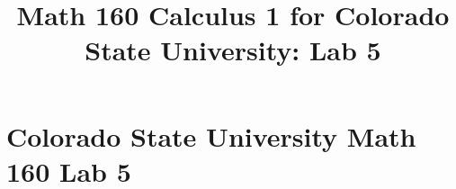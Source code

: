 \documentclass[10pt,handout,twocolumn,twoside,wordchoicegiven]{xourse}
\title{Math 160 Calculus 1 for Colorado State University: Lab 5}
\begin{document}
\maketitle

\setcounter{tocdepth}{2}


\part{Colorado State University Math 160 Lab 5}


\chapterstyle
\begin{graded}{0}
\end{graded}
\sectionstyle
\begin{graded}{29}
\end{graded}

%
%
%
%
\end{document}
